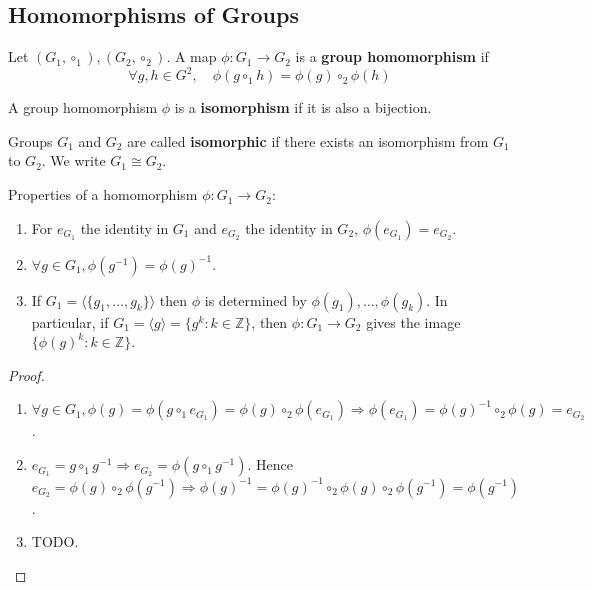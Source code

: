 \subsection{Homomorphisms of Groups}

\begin{definition}
	Let $(G_1, \circ_1), (G_2, \circ_2)$. A map $\phi: G_1 \rightarrow G_2$ is a \textbf{group homomorphism} if
	\[
		\forall g, h \in G^2, \quad \phi(g \circ_1 h) = \phi(g) \circ_2 \phi(h)
	\]
\end{definition}

\begin{definition}
	A group homomorphism $\phi$ is a \textbf{isomorphism} if it is also a bijection.
\end{definition}

\begin{definition}
	Groups $G_1$ and $G_2$ are called \textbf{isomorphic} if there exists an isomorphism from $G_1$ to $G_2$. We write $G_1 \cong G_2$.
\end{definition}

\begin{proposition}
	Properties of a homomorphism $\phi: G_1 \rightarrow G_2$:
	\begin{enumerate}
		\item For $e_{G_1}$ the identity in $G_1$ and $e_{G_2}$ the identity in $G_2$, $\phi(e_{G_1}) = e_{G_2}$.
		\item $\forall g \in G_1, \phi(g^{-1}) = \phi(g)^{-1}$.
		\item If $G_1 = \langle \{ g_1, \dots, g_k \} \rangle$ then $\phi$ is determined by $\phi(g_1), \dots, \phi(g_k)$. In particular, if $G_1 = \langle g \rangle = \{ g^k: k \in \mathbb{Z} \}$, then $\phi: G_1 \rightarrow G_2$ gives the image $\{ \phi(g)^k: k \in \mathbb{Z} \}$.
	\end{enumerate}
\end{proposition}

\begin{proof}
	\hfill
	\begin{enumerate}
		\item $\forall g \in G_1, \phi(g) = \phi(g \circ_1 e_{G_1}) = \phi(g) \circ_2 \phi(e_{G_1}) \Longrightarrow \phi(e_{G_1}) = \phi(g)^{-1} \circ_2 \phi(g) = e_{G_2}$.
		\item $e_{G_1} = g \circ_1 g^{-1} \Rightarrow e_{G_2} = \phi(g \circ_1 g^{-1})$. Hence $e_{G_2} = \phi(g) \circ_2 \phi(g^{-1}) \Longrightarrow \phi(g)^{-1} = \phi(g)^{-1} \circ_2 \phi(g) \circ_2 \phi(g^{-1}) = \phi(g^{-1})$.
		\item TODO.
	\end{enumerate}
\end{proof}

